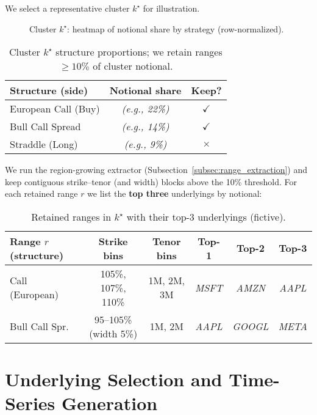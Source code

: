 \documentclass[12pt,a4paper]{report}
\begin{document}
We select a representative cluster $k^\star$ for illustration.

\begin{figure}[h]
\centering
\fbox{\rule{0pt}{2.2in}\rule{.95\linewidth}{0pt}}
\caption{Cluster $k^\star$: heatmap of notional share by strategy (row-normalized).}
\label{fig:kstar_strategy}
\end{figure}

\begin{table}[h]
\centering
\begin{tabular}{lcc}
\toprule
\textbf{Structure (side)} & \textbf{Notional share} & \textbf{Keep?} \\
\midrule
European Call (Buy) & \emph{(e.g., 22\%)} & $\checkmark$ \\
Bull Call Spread    & \emph{(e.g., 14\%)} & $\checkmark$ \\
Straddle (Long)     & \emph{(e.g., 9\%)}  & $\times$ \\
\bottomrule
\end{tabular}
\caption{Cluster $k^\star$ structure proportions; we retain ranges $\ge 10\%$ of cluster notional.}
\label{tab:kstar_struct_mix}
\end{table}


We run the region-growing extractor (Subsection~\ref{subsec:range_extraction}) and keep contiguous strike--tenor (and width) blocks above the 10\% threshold. For each retained range $r$ we list the \textbf{top three} underlyings by notional:


\begin{table}[h]
\centering
\begin{tabular}{lcc|ccc}
\toprule
\textbf{Range $r$ (structure)} & \textbf{Strike bins} & \textbf{Tenor bins} & \textbf{Top-1} & \textbf{Top-2} & \textbf{Top-3} \\
\midrule
Call (European) & 105\%, 107\%, 110\% & 1M, 2M, 3M & \emph{MSFT} & \emph{AMZN} & \emph{AAPL} \\
Bull Call Spr.  & 95–105\% (width 5\%) & 1M, 2M     & \emph{AAPL} & \emph{GOOGL} & \emph{META} \\
\bottomrule
\end{tabular}
\caption{Retained ranges in $k^\star$ with their top-3 underlyings (fictive).}
\label{tab:kstar_ranges_top3}
\end{table}

\section{Underlying Selection and Time-Series Generation}
\label{sec:ts_generation_example}
\end{document}
